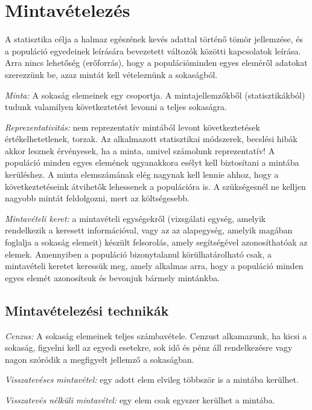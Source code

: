 \chapter{Mintavételezés} \label{ch:mintavetel}

A statisztika célja a halmaz egészének kevés adattal történő tömör 
jellemzése, és a populáció egyedeinek leírására bevezetett változók közötti kapcsolatok leírása. Arra nincs lehetőség (erőforrás), hogy  a populációminden egyes eleméről adatokat szerezzünk be, azaz mintát kell vételeznünk a sokaságból.

\emph{Minta:} A sokaság elemeinek egy csoportja. A mintajellemzőkből (statisztikákból) tudunk valamilyen következtetést levonni a teljes sokaságra.

\emph{Reprezentativitás:} nem reprezentatív mintából levont következtetések értékelhetetlenek, torzak. Az alkalmazott statisztikai módszerek, becslési hibák akkor lesznek érvényesek, ha a minta, amivel számolunk reprezentatív! A populáció minden egyes elemének ugyanakkora esélyt kell biztosítani a mintába kerüléshez. A minta elemszámának elég nagynak kell lennie ahhoz, hogy a következtetéseink átvihetők lehessenek a populációra is. A szükségesnél ne kelljen nagyobb mintát feldolgozni, mert az költségesebb.

\emph{Mintavételi keret:} a mintavételi egységekről (vizsgálati egység, amelyik rendelkezik a keresett információval, vagy az az alapegység, amelyik magában foglalja a sokaság elemeit) készült felsorolás, amely segítségével azonosíthatóak az elemek. Amennyiben a populáció bizonytalanul körülhatárolható csak, a mintavételi keretet keressük meg, amely alkalmas arra, hogy a populáció minden egyes elemét azonosítsuk és bevonjuk bármely mintánkba.

\section{Mintavételezési technikák}

\emph{Cenzus:} A sokaság elemeinek teljes számbavétele. Cenzust alkamazunk, ha kicsi a sokaság, figyelni kell az egyedi esetekre, sok idő és pénz áll rendelkezésre vagy nagon szóródik a megfigyelt jellemző a sokaságban.

\emph{Visszatevéses mintavétel:} egy adott elem elvileg többször is a mintába kerülhet.

\emph{Visszatevés nélküli mintavétel:} egy elem csak egyszer kerülhet a mintába.


